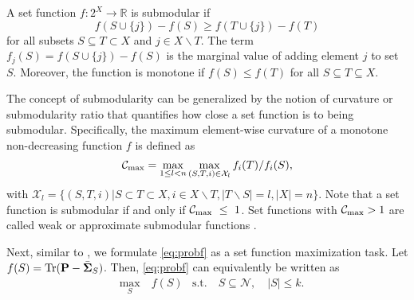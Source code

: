 A set function $f:2^X\rightarrow \mathbb{R}$ is submodular if
%
\begin{equation}
f(S\cup \{j\})-f(S) \geq f(T\cup \{j\})-f(T)
\end{equation}
%
for all subsets $S\subseteq T\subset X$ and $j\in X\backslash T$. The term $f_j(S)=f(S\cup \{j\})-f(S)$ is the marginal value of adding element $j$ to set $S$. Moreover, the function is monotone if $f(S)\leq f(T)$ for all $S\subseteq T\subseteq X$. 

The concept of submodularity can be generalized by the notion of curvature or submodularity ratio \cite{das2011submodular} that quantifies how close a set function is to being submodular. Specifically, the maximum element-wise curvature of a monotone non-decreasing function $f$ is defined as
%
\begin{equation}
{\cal C}_{\max}=\max_{1\le l<n}{\max_{(S,T,i)\in \mathcal{X}_l}{f_i(T)\slash f_i(S)}},
\end{equation}
%
with $\mathcal{X}_l = \{(S,T,i)|S \subset T \subset X, i\in X \backslash T, |T\backslash S|=l,|X|=n\}$. Note that a set function is submodular if and only if ${\cal C}_{\max}~\le~1$. Set functions with ${\cal C}_{\max} > 1$ are called weak or approximate submodular functions \cite{das2011submodular}.

Next, similar to \cite{chamon2017greedy}, we formulate \ref{eq:probf} as a  set function maximization task. Let $f(S) = \mathrm{Tr}(\P-\bar{\S}_S)$. Then,  \ref{eq:probf} can equivalently be written as
%
\begin{equation}\label{eq:probsub}
\begin{aligned}
& \underset{S}{\text{max}}
\quad f(S)
& \text{s.t.}\quad S\subseteq\mathcal{N},\quad |S| \leq k.
\end{aligned}
\end{equation}

